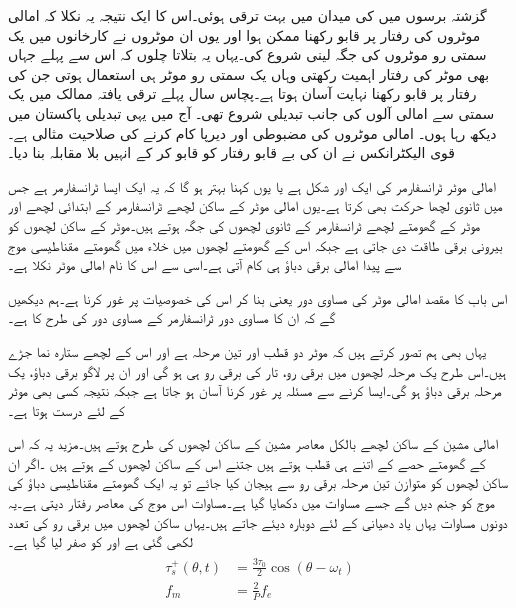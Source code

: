 گزشتہ برسوں میں  کی میدان میں بہت ترقی ہوئی۔اس کا ایک نتیجہ یہ نکلا کہ امالی موٹروں کی رفتار پر قابو رکھنا ممکن ہوا اور یوں ان موٹروں نے کارخانوں میں یک سمتی رو موٹروں کی جگہ لینی شروع کی۔یہاں یہ بتلاتا چلوں کہ اس سے پہلے جہاں بھی موٹر کی رفتار اہمیت رکھتی وہاں یک سمتی رو موٹر ہی استعمال ہوتی جن کی رفتار پر قابو رکھنا نہایت آسان ہوتا ہے۔پچاس سال پہلے ترقی یافتہ ممالک میں یک سمتی سے امالی آلوں کی جانب تبدیلی شروع تھی۔ آج میں یہی تبدیلی پاکستان میں دیکھ رہا ہوں۔ امالی موٹروں کی مضبوطی اور دیرپا کام کرنے کی صلاحیت مثالی ہے۔ قوی الیکٹرانکس نے ان کی بے قابو رفتار کو قابو کر کے انہیں بلا مقابلہ بنا دیا۔

امالی موٹر ٹرانسفارمر کی ایک اور شکل ہے یا یوں کہنا بہتر ہو گا کہ یہ ایک ایسا ٹرانسفارمر ہے جس میں ثانوی لچھا حرکت بھی کرتا ہے۔یوں امالی موٹر کے ساکن لچھے ٹرانسفارمر کے ابتدائی لچھے اور موٹر کے گھومتے لچھے ٹرانسفارمر کے ثانوی لچھوں کی جگہ ہوتے ہیں۔موٹر کے ساکن لچھوں کو بیرونی برقی طاقت دی جاتی ہے جبکہ اس کے گھومتے لچھوں میں خلاء میں گھومتے مقناطیسی موج سے پیدا امالی برقی دباؤ ہی کام آتی ہے۔اسی سے اس کا نام امالی موٹر نکلا ہے۔

 اس باب کا مقصد امالی موٹر کی مساوی دور یعنی  بنا کر اس کی خصوصیات پر غور کرنا ہے۔ہم دیکھیں گے کہ ان کا مساوی دور ٹرانسفارمر کے مساوی دور کی طرح کا ہے۔

یہاں بھی ہم تصور کرتے ہیں کہ موٹر دو قطب اور تین مرحلہ ہے اور اس کے لچھے ستارہ نما جڑے ہیں۔اس طرح یک مرحلہ لچھوں میں برقی رو، تار کی برقی رو ہی ہو گی اور ان پر لاگو برقی دباؤ، یک مرحلہ برقی دباؤ ہو گی۔ایسا کرنے سے مسئلہ پر غور کرنا آسان ہو جاتا ہے جبکہ نتیجہ کسی بھی موٹر کے لئے درست ہوتا ہے۔

امالی مشین کے ساکن لچھے بالکل معاصر مشین کے ساکن لچھوں کی طرح ہوتے ہیں۔مزید یہ کہ اس کے گھومتے حصے کے اتنے ہی قطب ہوتے ہیں جتنے اس کے ساکن لچھوں کے ہوتے ہیں ۔اگر ان ساکن لچھوں کو متوازن تین مرحلہ برقی رو سے ہیجان کیا جائے تو یہ ایک گھومتے مقناطیسی دباؤ کی موج کو جنم دیں گے جسے مساوات   میں دکھایا گیا ہے۔مساوات   اس موج کی معاصر رفتار دیتی ہے۔یہ دونوں مساوات یہاں یاد دھیانی کے لئے دوبارہ دیئے جاتے ہیں۔یہاں ساکن لچھوں میں برقی رو کی تعدد  لکھی گئی ہے اور  کو صفر لیا گیا ہے۔
\begin{gather}
\begin{aligned}\label{مساوات_امالی_گھومتا_مقناطیسی_دباؤ_الف}
\tau_s^+ (\theta,t)&=\frac{3 \tau_0}{2} \cos (\theta-\omega_ t)\\
f_m&=\frac{2}{P} f_e
\end{aligned}
\end{gather}

